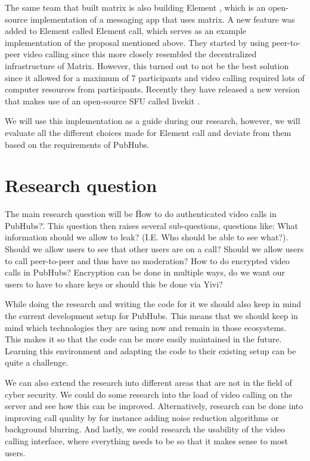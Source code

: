 \documentclass[11pt,a4paper]{article}
\begin{document}
The same team that built matrix is also building Element \cite{ELEMENT}, which is an open-source implementation of a messaging app that uses matrix. A new feature was added to Element called Element call, which serves as an example implementation of the proposal mentioned above. They started by using peer-to-peer video calling since this more closely resembled the decentralized infrastructure of Matrix. However, this turned out to not be the best solution since it allowed for a maximum of 7 participants and video calling required lots of computer resources from participants. Recently they have released a new version that makes use of an open-source SFU called livekit \cite{LIVEKIT}.

We will use this implementation as a guide during our research, however, we will evaluate all the different choices made for Element call and deviate from them based on the requirements of PubHubs.

\section{Research question}
The main research question will be \"How to do authenticated video calls in PubHubs?\". This question then raises several sub-questions, questions like: What information should we allow to leak? (I.E. Who should be able to see what?). Should we allow users to see that other users are on a call? Should we allow users to call peer-to-peer and thus have no moderation? How to do encrypted video calls in PubHubs? Encryption can be done in multiple ways, do we want our users to have to share keys or should this be done via Yivi? 

While doing the research and writing the code for it we should also keep in mind the current development setup for PubHubs. This means that we should keep in mind which technologies they are using now and remain in those ecosystems. This makes it so that the code can be more easily maintained in the future. Learning this environment and adapting the code to their existing setup can be quite a challenge.

We can also extend the research into different areas that are not in the field of cyber security. We could do some research into the load of video calling on the server and see how this can be improved. Alternatively, research can be done into improving call quality by for instance adding noise reduction algorithms or background blurring. And lastly, we could research the usability of the video calling interface, where everything needs to be so that it makes sense to most users.



\end{document}
